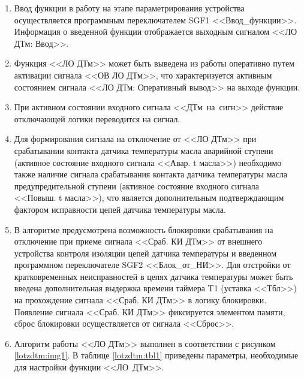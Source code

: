 \documentclass[a4paper, 12pt,table, hidelinks, DIV=calc]{extarticle} %
\begin{document}
\begin{enumerate}[label=\arabic{section}.\arabic{subsection}.\arabic{enumi}, labelsep=4pt, leftmargin=0pt, itemindent=57pt, itemsep=0pt, parsep=5pt]
\begin{enumerate}[label=\arabic{section}.\arabic{subsection}.\arabic{enumi}.\arabic*, labelsep=4pt, leftmargin=0em, itemindent=65pt, parsep=0pt]
\item
Ввод функции в работу на этапе параметрирования устройства осуществляется программным переключателем SGF1 <<Ввод\_функции>>. Информация о введенной функции отображается выходным сигналом <<ЛО ДТм: Ввод>>.
\item
Функция <<ЛО ДТм>> может быть выведена из работы оперативно путем активации сигнала <<ОВ ЛО ДТм>>, что характеризуется активным состоянием сигнала <<ЛО ДТм: Оперативный вывод>> на выходе функции. 
\item
При активном состоянии входного сигнала <<ДТм~на~сигн>> действие отключающей логики переводится на сигнал.
\item
Для формирования сигнала на отключение от <<ЛО ДТм>> при срабатывании контакта датчика температуры масла аварийной ступени (активное состояние входного сигнала <<Авар. t масла>>) необходимо также наличие сигнала срабатывания контакта датчика температуры масла предупредительной ступени (активное состояние входного сигнала <<Повыш. t масла>>), что является дополнительным подтверждающим фактором исправности цепей датчика температуры масла.

\item
В алгоритме предусмотрена возможность блокировки срабатывания на отключение при приеме сигнала <<Сраб. КИ ДТм>> от внешнего устройства контроля изоляции цепей датчика температуры и введенном программном переключателе SGF2 <<Блок\_от\_НИ>>. Для отстройки от кратковременных неисправностей в цепях датчика температуры может быть введена дополнительная выдержка времени таймера T1 (уставка <<Тбл>>) на прохождение сигнала <<Сраб. КИ ДТм>> в логику блокировки. 
Появление сигнала <<Сраб. КИ ДТм>> фиксируется элементом памяти, сброс блокировки осуществляется от сигнала <<Сброс>>.

\item
Алгоритм работы <<ЛО ДТм>> выполнен в соответствии с рисунком \ref{lotzdtm:img1}. В таблице \ref{lotzdtm:tbl1} приведены параметры, необходимые для настройки функции <<ЛО~ДТм>>.


\end{enumerate}
\end{enumerate}
\end{document}
